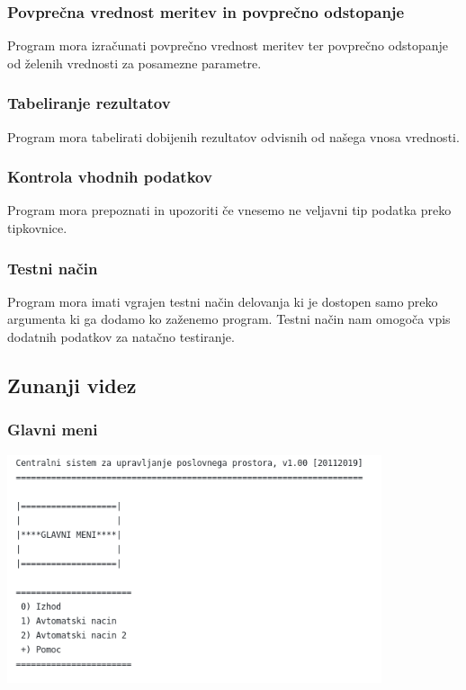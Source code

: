 \documentclass[a4paper,12pt]{article}
\begin{document}
			\subsubsection{Povprečna vrednost meritev in povprečno odstopanje}
				\qquad \qquad Program mora izračunati povprečno vrednost meritev ter povprečno odstopanje od 
				želenih vrednosti za posamezne parametre.

			\subsubsection{Tabeliranje rezultatov}
				\qquad \qquad Program mora tabelirati dobijenih rezultatov odvisnih od našega vnosa vrednosti.

			\subsubsection{Kontrola vhodnih podatkov}
				\qquad \qquad Program mora prepoznati in upozoriti če vnesemo ne veljavni tip podatka preko tipkovnice.

			\subsubsection{Testni način}
				\qquad \qquad Program mora imati vgrajen testni način delovanja ki je dostopen samo preko argumenta
				ki ga dodamo ko zaženemo program. Testni način nam omogoča vpis dodatnih podatkov za natačno testiranje.
		

		\subsection{Zunanji videz}

			\subsubsection{Glavni meni}

				\includegraphics[width=11cm]{diagrami_slike/gl_meni.png}
\end{document}
